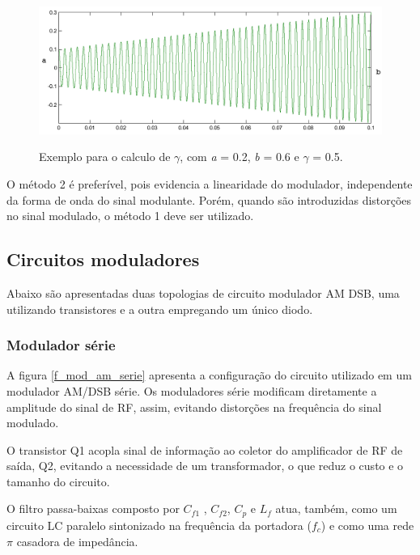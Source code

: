 \begin{figure}[H]
    \centering
    \caption{Exemplo para o calculo de $\gamma$, com \textit{a} = 0.2, \textit{b} = 0.6 e $\gamma$ = 0.5.}
    \includegraphics[scale=0.4]{Imagens/gamma2.png}
    \label{f_gamma2}
\end{figure}

O método 2 é preferível, pois evidencia a linearidade do modulador, independente da forma de onda do sinal modulante. Porém, quando são introduzidas distorções no sinal modulado, o método 1 deve ser utilizado.

\subsection{Circuitos moduladores}
Abaixo são apresentadas duas topologias de circuito modulador AM DSB, uma utilizando transistores e a outra empregando um único diodo.

\subsubsection{Modulador série}

A figura \ref{f_mod_am_serie} apresenta a configuração do circuito utilizado em um modulador AM/DSB série.
Os moduladores série modificam diretamente a amplitude do sinal de RF, assim, evitando distorções na frequência do sinal modulado.

O transistor Q1 acopla sinal de informação ao coletor do amplificador de RF de saída, Q2, evitando a necessidade de um transformador, o que reduz o custo e o tamanho do circuito.

O filtro passa-baixas composto por $C_{f1}$ , $C_{f2}$, $C_p$ e $L_f$ atua, também, como um circuito LC paralelo sintonizado na frequência da portadora ($f_c$) e como uma rede $\pi$ casadora de impedância.

